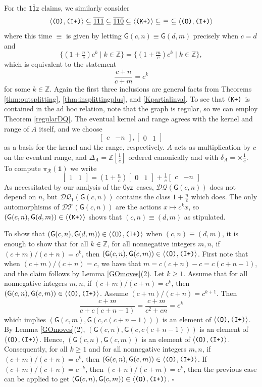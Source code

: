 \documentclass[12pt]{amsbook}%
\theoremstyle{defin}
\theoremstyle{remark}
\numberwithin{equation}{chapter}
\numberwithin{theor}{section}
\newenvironment{proofoffirstpart}[1]{{\sc Proof (first part).}}{\hfill$\square$}
\newcommand{\ZZ}{\mathbb{Z}}
\newcommand{\xyz}[1]{\mbox{$\mathsf{#1}$}}
\newcommand{\xyzrel}[1]{\mbox{$\overline{\underline{\mathsf{ #1}}}$}}
\newcommand{\IIIp}{\mbox{\texttt{\textup{(I+)}}}}
\newcommand{\OOO}{\mbox{\texttt{\textup{(O)}}}}
\newcommand{\KKKp}{\mbox{\texttt{\textup{(K+)}}}}
\newcommand{\DT}{\mathcal{DT}}
\newcommand{\DQ}{\mathcal{DQ}}
\newcommand{\DQp}{\mathcal{DQ}_1}
\newcommand{\GO}{{\mathsf G}}
\newcommand{\uu}{\mathbf{1}}
\newcommand{\pK}[1]{\pi_{\mathcal R}(#1)}
\begin{document}
\begin{proofoffirstpart}{Proposition \ref{cuntzcomplete}}
For the \xyzrel{11z} claims, we similarly consider
 \[
\langle\OOO,\IIIp\rangle\subseteq \xyzrel{111}\subseteq \xyzrel{110}\subseteq \langle\KKKp\rangle\subseteq\ \equiv\ \subseteq\langle\OOO,\IIIp\rangle
\]
where this time $\equiv$ is given by letting $\GO(c,n)\equiv \GO(d,m)$ precisely when $c=d$ and
\[
\{(1+\tfrac nc)c^k\mid k\in\ZZ\}=\{(1+\tfrac mc)c^k\mid k\in\ZZ\},
\]
which is equivalent to the statement
\[
\frac{c+n}{c+m}=c^k
\]
for some $k\in\ZZ$. Again the first three inclusions are general facts from Theorems \ref{thm:outsplitting}, \ref{thm:insplittingplus}, and \ref{Kpartialinva}.  To see that \KKKp\ is contained in the ad hoc relation, note that the graph is regular,
so we can employ Theorem \ref{regularDQ}. The eventual kernel and range agrees with the kernel and range of $A$ itself, and we choose
\[
\begin{bmatrix}c&-n\end{bmatrix}, \begin{bmatrix}0&1\end{bmatrix}
\]
as a basis for the kernel and the range, respectively.  $A$ acts as multiplication by $c$ on the eventual range, and $\Delta_A=\ZZ[\frac1c]$ ordered canonically and with $\delta_A=\times\frac1c$. To compute $\pK{\uu}$ we write
\[
\begin{bmatrix}1&1\end{bmatrix}=(1+\tfrac nc)\begin{bmatrix}0&1\end{bmatrix}+\tfrac 1c\begin{bmatrix}c&-n\end{bmatrix}
\]
As necessitated by our analysis of the \xyz{0yz}\ cases, $\DQ(\GO(c,n))$ does not depend on $n$, but $\DQp(\GO(c,n))$ contains the class $1+\tfrac nc$ which does. The only automorphisms of $\DT(\GO(c,n))$ are the actions $x\mapsto c^kx$, so $(\GO(c,n),\GO(d,m))\in\langle\KKKp\rangle$ shows that $(c,n)\equiv (d,m)$ as stipulated.

To show that $(\GO(c,n),\GO(d,m))\in\langle\OOO,\IIIp\rangle$ when $(c,n)\equiv (d,m)$, it is enough to show that for all $k \in \ZZ$, for all nonnegative integers $m, n$, if  $(c+m)/(c+n)=c^k$, then $(\GO(c,n),\GO(c,m))\in\langle\OOO,\IIIp\rangle$.  First note that  when $(c+m)/(c+n)=c$, we have that $m=c(c+n)-c=c(c+n-1)$, and the claim follows by Lemma \ref{GOmoves}(2).  Let $k \geq 1$.  Assume that for all nonnegative integers $m,n$, if $(c+m)/(c+n)=c^k$, then $(\GO(c,n),\GO(c,m))\in\langle\OOO,\IIIp\rangle$.  Assume $(c+m)/(c+n)=c^{k+1}$.  Then 
 \[
\frac{c+m}{ c + c(c+n-1) } = \frac{c+m}{c^2+cn} = c^k
 \]
 which implies $(\GO(c,m),\GO(c, c(c+n-1)))$ is an element of $\langle\OOO,\IIIp\rangle$.  By Lemma \ref{GOmoves}(2), $(\GO(c,n),\GO(c, c(c+n-1)))$ is an element of $\langle\OOO,\IIIp\rangle$.  Hence, $(\GO(c,n),\GO(c,m))$ is an element of $\langle\OOO,\IIIp\rangle$.  Consequently, for all $k \geq 1$ and for all nonnegative integers $m, n$, if $(c+m)/(c+n)=c^k$, then $(\GO(c,n),\GO(c,m))\in\langle\OOO,\IIIp\rangle$.  If $(c+m)/(c+n)=c^{-k}$, then $(c+n)/(c+m)=c^k$, then the previous case can be applied to get $(\GO(c,n),\GO(c,m))\in\langle\OOO,\IIIp\rangle$.
\end{proofoffirstpart}
\end{document}
